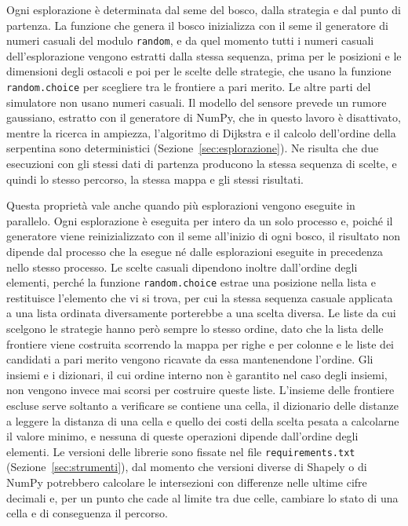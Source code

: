 Ogni esplorazione è determinata dal seme del bosco, dalla strategia e dal punto di partenza. La funzione che genera il bosco inizializza con il seme il generatore di numeri casuali del modulo \texttt{random}, e da quel momento tutti i numeri casuali dell'esplorazione vengono estratti dalla stessa sequenza, prima per le posizioni e le dimensioni degli ostacoli e poi per le scelte delle strategie, che usano la funzione \texttt{random.choice} per scegliere tra le frontiere a pari merito. Le altre parti del simulatore non usano numeri casuali. Il modello del sensore prevede un rumore gaussiano, estratto con il generatore di NumPy, che in questo lavoro è disattivato, mentre la ricerca in ampiezza, l'algoritmo di Dijkstra e il calcolo dell'ordine della serpentina sono deterministici (Sezione~\ref{sec:esplorazione}). Ne risulta che due esecuzioni con gli stessi dati di partenza producono la stessa sequenza di scelte, e quindi lo stesso percorso, la stessa mappa e gli stessi risultati.

Questa proprietà vale anche quando più esplorazioni vengono eseguite in parallelo. Ogni esplorazione è eseguita per intero da un solo processo e, poiché il generatore viene reinizializzato con il seme all'inizio di ogni bosco, il risultato non dipende dal processo che la esegue né dalle esplorazioni eseguite in precedenza nello stesso processo. Le scelte casuali dipendono inoltre dall'ordine degli elementi, perché la funzione \texttt{random.choice} estrae una posizione nella lista e restituisce l'elemento che vi si trova, per cui la stessa sequenza casuale applicata a una lista ordinata diversamente porterebbe a una scelta diversa. Le liste da cui scelgono le strategie hanno però sempre lo stesso ordine, dato che la lista delle frontiere viene costruita scorrendo la mappa per righe e per colonne e le liste dei candidati a pari merito vengono ricavate da essa mantenendone l'ordine. Gli insiemi e i dizionari, il cui ordine interno non è garantito nel caso degli insiemi, non vengono invece mai scorsi per costruire queste liste. L'insieme delle frontiere escluse serve soltanto a verificare se contiene una cella, il dizionario delle distanze a leggere la distanza di una cella e quello dei costi della scelta pesata a calcolarne il valore minimo, e nessuna di queste operazioni dipende dall'ordine degli elementi. Le versioni delle librerie sono fissate nel file \texttt{requirements.txt} (Sezione~\ref{sec:strumenti}), dal momento che versioni diverse di Shapely o di NumPy potrebbero calcolare le intersezioni con differenze nelle ultime cifre decimali e, per un punto che cade al limite tra due celle, cambiare lo stato di una cella e di conseguenza il percorso.

